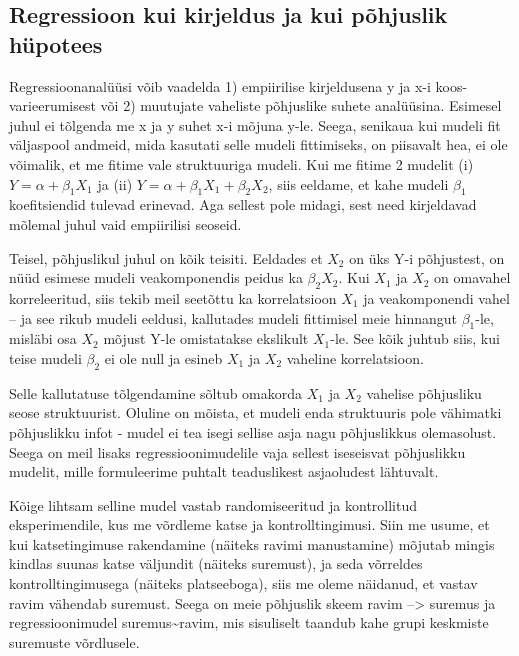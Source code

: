 \documentclass[]{book}
\begin{document}
\subsection*{Regressioon kui kirjeldus ja kui põhjuslik
hüpotees}\label{regressioon-kui-kirjeldus-ja-kui-pohjuslik-hupotees}

Regressioonanalüüsi võib vaadelda 1) empiirilise kirjeldusena y ja x-i
koos-varieerumisest või 2) muutujate vaheliste põhjuslike suhete
analüüsina. Esimesel juhul ei tõlgenda me x ja y suhet x-i mõjuna y-le.
Seega, senikaua kui mudeli fit väljaspool andmeid, mida kasutati selle
mudeli fittimiseks, on piisavalt hea, ei ole võimalik, et me fitime vale
struktuuriga mudeli. Kui me fitime 2 mudelit (i)
\(Y = \alpha + \beta_1X_1\) ja (ii)
\(Y = \alpha + \beta_1X_1 + \beta_2X_2\), siis eeldame, et kahe mudeli
\(\beta_1\) koefitsiendid tulevad erinevad. Aga sellest pole midagi,
sest need kirjeldavad mõlemal juhul vaid empiirilisi seoseid.

Teisel, põhjuslikul juhul on kõik teisiti. Eeldades et \(X_2\) on üks
Y-i põhjustest, on nüüd esimese mudeli veakomponendis peidus ka
\(\beta_2X_2\). Kui \(X_1\) ja \(X_2\) on omavahel korreleeritud, siis
tekib meil seetõttu ka korrelatsioon \(X_1\) ja veakomponendi vahel --
ja see rikub mudeli eeldusi, kallutades mudeli fittimisel meie hinnangut
\(\beta_1\)-le, misläbi osa \(X_2\) mõjust Y-le omistatakse ekslikult
\(X_1\)-le. See kõik juhtub siis, kui teise mudeli \(\beta_2\) ei ole
null ja esineb \(X_1\) ja \(X_2\) vaheline korrelatsioon.

Selle kallutatuse tõlgendamine sõltub omakorda \(X_1\) ja \(X_2\)
vahelise põhjusliku seose struktuurist. Oluline on mõista, et mudeli
enda struktuuris pole vähimatki põhjuslikku infot - mudel ei tea isegi
sellise asja nagu põhjuslikkus olemasolust. Seega on meil lisaks
regressioonimudelile vaja sellest iseseisvat põhjuslikku mudelit, mille
formuleerime puhtalt teaduslikest asjaoludest lähtuvalt.

Kõige lihtsam selline mudel vastab randomiseeritud ja kontrollitud
eksperimendile, kus me võrdleme katse ja kontrolltingimusi. Siin me
usume, et kui katsetingimuse rakendamine (näiteks ravimi manustamine)
mõjutab mingis kindlas suunas katse väljundit (näiteks suremust), ja
seda võrreldes kontrolltingimusega (näiteks platseeboga), siis me oleme
näidanud, et vastav ravim vähendab suremust. Seega on meie põhjuslik
skeem ravim --\textgreater{} suremus ja regressioonimudel
suremus\textasciitilde{}ravim, mis sisuliselt taandub kahe grupi
keskmiste suremuste võrdlusele.
\end{document}
